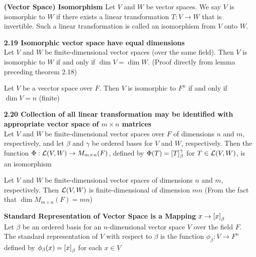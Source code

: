 \documentclass[11pt]{article}
\begin{document}
\begin{defn*}
    \textbf{(Vector Space) Isomorphism} Let $V$ and $W$ be vector spaces. We say $V$ is isomorphic to $W$ if there exists a linear transformation $T:V\to W$ that is invertible. Such a linear transformation is called an isomorphism from $V$ onto $W$. 
\end{defn*}


\begin{theorem*}
    \textbf{2.19 Isomorphic vector space have equal dimensions} \\
    Let $V$ and $W$ be finite-dimensional vector spaces (over the same field). Then $V$ is isomorphic to $W$ if and only if $\dim{V} = \dim{W}$. (Proof directly from lemma preceding theorem 2.18)
\end{theorem*}

\begin{corollary*}
    Let $V$ be a vecctor space over $F$. Then $V$ is isomorphic to $F^n$ if and only if $\dim{V}=n$ (finite)
\end{corollary*}


\begin{theorem*}
    \textbf{2.20 Collection of all linear transformation may be identified with appropriate vector space of $m\times n$ matrices} \\ 
    Let $V$ and $W$ be finite-dimensional vector spaces over $F$ of dimensions $n$ and $m$, respectively, and let $\beta$ and $\gamma$ be ordered bases for $V$ and $W$, respectively. Then the function $\Phi:\mathcal{L}(V,W) \to M_{m\times n}(F)$, defined by $\Phi(T) = \left[ T \right]_{\beta}^{\gamma}$ for $T\in \mathcal{L}(V,W)$, is an isomorphism
\end{theorem*}


\begin{corollary*}
    Let $V$ and $W$ be finite-dimensional vector spaces of dimensions $n$ and $m$, respectively. Then $\mathcal{L}(V,W)$ is finite-dimensional of dimension $mn$ (From the fact that $\dim{M_{m\times n}(F)} = mn$)
\end{corollary*}

\begin{defn*}
    \textbf{Standard Representation of Vector Space is a Mapping $x\rightarrow \left[ x \right]_{\beta}$} \\
    Let $\beta$ be an ordered basis for an $n$-dimensional vector space $V$ over the field $F$. The standard representation of $V$ with respect to $\beta$ is the function $\phi_{\beta}:V\to F^n$ defined by $\phi_{\beta}(x) = \left[ x \right]_{\beta}$ for each $x\in V$ 
\end{defn*}
\end{document}
